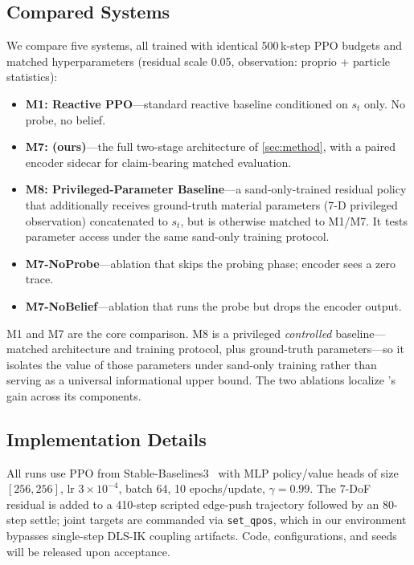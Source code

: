 \subsection{Compared Systems}

We compare five systems, all trained with identical 500\,k-step PPO budgets and matched hyperparameters (residual scale 0.05, observation: proprio + particle statistics):

\begin{itemize}
    \item \textbf{M1: Reactive PPO}---standard reactive baseline conditioned on $s_t$ only. No probe, no belief.
    \item \textbf{M7: \PTA{} (ours)}---the full two-stage architecture of \cref{sec:method}, with a paired encoder sidecar for claim-bearing matched evaluation.
    \item \textbf{M8: Privileged-Parameter Baseline}---a sand-only-trained residual policy that additionally receives ground-truth material parameters (7-D privileged observation) concatenated to $s_t$, but is otherwise matched to M1/M7. It tests parameter access under the same sand-only training protocol.
    \item \textbf{M7-NoProbe}---ablation that skips the probing phase; encoder sees a zero trace.
    \item \textbf{M7-NoBelief}---ablation that runs the probe but drops the encoder output.
\end{itemize}

M1 and M7 are the core comparison. M8 is a privileged \emph{controlled} baseline---matched architecture and training protocol, plus ground-truth parameters---so it isolates the value of those parameters under sand-only training rather than serving as a universal informational upper bound. The two ablations localize \PTA{}'s gain across its components.

\subsection{Implementation Details}

All runs use PPO from Stable-Baselines3~\cite{raffin2021stable} with MLP policy/value heads of size $[256,256]$, lr $3\times10^{-4}$, batch 64, 10 epochs/update, $\gamma=0.99$. The 7-DoF residual is added to a 410-step scripted edge-push trajectory followed by an 80-step settle; joint targets are commanded via \texttt{set\_qpos}, which in our environment bypasses single-step DLS-IK coupling artifacts. Code, configurations, and seeds will be released upon acceptance.
